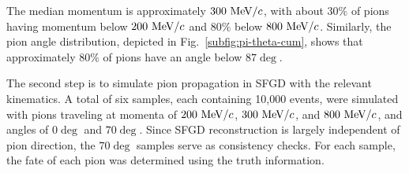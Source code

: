           The median momentum is approximately $300~\textrm{MeV}/c$, with about $30\%$ of pions having momentum below $200~\textrm{MeV}/c$ and $80\%$ below $800~\textrm{MeV}/c$. 
          Similarly, the pion angle distribution, depicted in Fig.~\ref{subfig:pi-theta-cum}, shows that approximately $80\%$ of pions have an angle below $87\deg$.

          The second step is to simulate pion propagation in SFGD with the relevant kinematics. 
          A total of six samples, each containing 10,000 events, were simulated with pions traveling at momenta of $200~\textrm{MeV}/c$, $300~\textrm{MeV}/c$, and $800~\textrm{MeV}/c$, and angles of $0\deg$ and $70\deg$. 
          Since SFGD reconstruction is largely independent of pion direction, the $70\deg$ samples serve as consistency checks. 
          For each sample, the fate of each pion was determined using the truth information.

